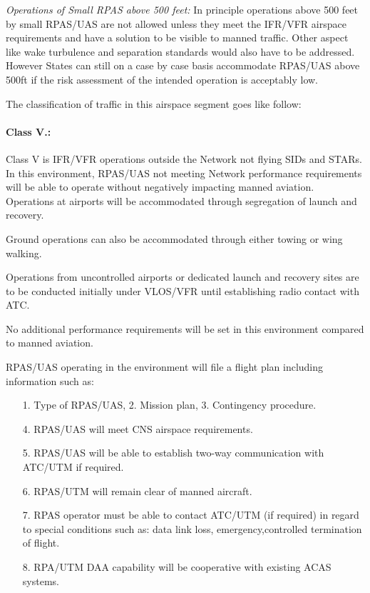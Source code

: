 \emph{Operations of Small RPAS above 500 feet:} In principle operations above 500 feet by small RPAS/UAS are not allowed unless they meet the IFR/VFR airspace requirements and have a solution to be visible to manned traffic. Other aspect like wake turbulence and separation standards would also have to be addressed. However States can still on a case by case basis accommodate RPAS/UAS above 500ft if the risk assessment of the intended operation is acceptably low.

\noindent The classification of traffic in this airspace segment goes like follow:

\paragraph{Class V.:} Class V is IFR/VFR operations outside the Network not flying SIDs and STARs. In this environment, RPAS/UAS not meeting Network performance requirements will be able to operate without negatively impacting manned aviation. Operations at airports will be accommodated through segregation of launch and recovery.

    Ground operations can also be accommodated through either towing or wing walking.

    Operations from uncontrolled airports or dedicated launch and recovery sites are to be conducted initially under VLOS/VFR until establishing radio contact with ATC.

    No additional performance requirements will be set in this environment compared to manned aviation.
    
    RPAS/UAS operating in the environment will file a flight plan including information such as:
    \begin{itemize}
        \item[1.] Type of RPAS/UAS, 2. Mission plan, 3. Contingency procedure.
        
        \item[4.] RPAS/UAS will meet CNS airspace requirements.
        
        \item[5.] RPAS/UAS will be able to establish two-way communication with ATC/UTM if required.
        
        \item[6.]  RPAS/UTM will remain clear of manned aircraft.
        
        \item[7.]  RPAS operator must be able to contact ATC/UTM (if required) in regard to special conditions such as: data link loss, emergency,controlled termination of flight.
        
        \item[8.] RPA/UTM DAA capability will be cooperative with existing ACAS systems.
    \end{itemize}
    

